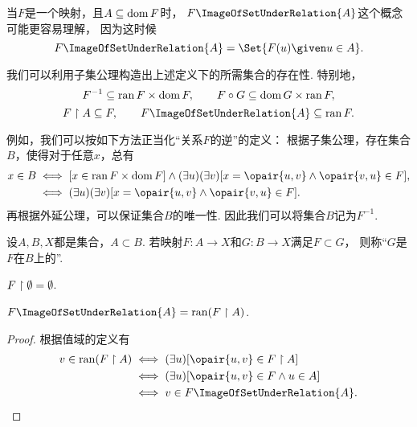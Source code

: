 当\(F\)是一个映射，且\(A \subseteq \operatorname{dom} F\)时，
\(F\ImageOfSetUnderRelation{A}\)这个概念可能更容易理解，
因为这时候\[
	F\ImageOfSetUnderRelation{A}
	= \Set{ F(u) \given u \in A }.
\]

我们可以利用子集公理构造出上述定义下的所需集合的存在性.
特别地，\[
	F^{-1} \subseteq \operatorname{ran} F \times \operatorname{dom} F, \qquad
	F \circ G \subseteq \operatorname{dom} G \times \operatorname{ran} F,
\]\[
	F \SetRestrict A \subseteq F, \qquad
	F\ImageOfSetUnderRelation{A} \subseteq \ran F.
\]

例如，我们可以按如下方法正当化“关系\(F\)的逆”的定义：
根据子集公理，存在集合\(B\)，使得对于任意\(x\)，总有\begin{align*}
	x \in B
	&\iff
	[x \in \ran F \times \dom F]
	\land
	(\exists u)(\exists v)[x = \opair{u,v} \land \opair{v,u} \in F], \\
	&\iff
	(\exists u)(\exists v)[x = \opair{u,v} \land \opair{v,u} \in F].
\end{align*}
再根据外延公理，可以保证集合\(B\)的唯一性.
因此我们可以将集合\(B\)记为\(F^{-1}\).

\begin{definition}
设\(A,B,X\)都是集合，\(A \subset B\).
若映射\(F\colon A \to X\)和\(G\colon B \to X\)满足\(F \subset G\)，
则称“\(G\)是\(F\)在\(B\)上的”.
\end{definition}

\begin{theorem}
\(F \upharpoonright \emptyset = \emptyset\).
\end{theorem}

\begin{theorem}
\(F\ImageOfSetUnderRelation{A} = \ran(F \SetRestrict A)\).
\begin{proof}
根据值域的定义有\begin{align*}
	v \in \ran(F \SetRestrict A)
	&\iff
	(\exists u)[\opair{u,v} \in F \SetRestrict A] \\
	&\iff
	(\exists u)[\opair{u,v} \in F \land u \in A] \\
	&\iff
	v \in F\ImageOfSetUnderRelation{A}.
	\qedhere
\end{align*}
\end{proof}
\end{theorem}

